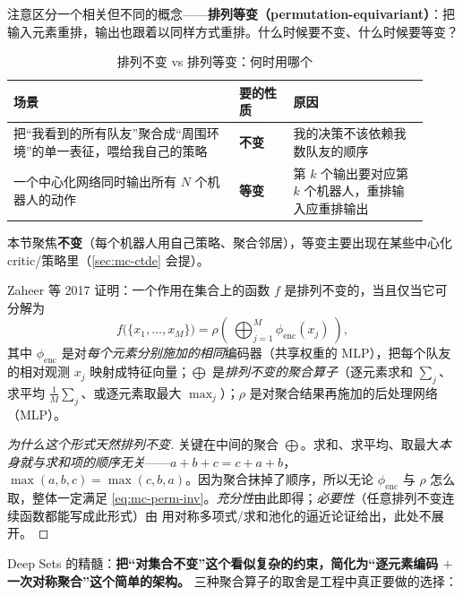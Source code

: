 \noindent 注意区分一个相关但不同的概念——\textbf{排列等变（permutation-equivariant）}：把输入元素重排，输出也跟着以同样方式重排。什么时候要不变、什么时候要等变？

\begin{table}[H]\centering\small
\caption{排列不变 vs 排列等变：何时用哪个}
\label{tab:mc-inv-equiv}
\begin{tabular}{p{0.50\linewidth}p{0.12\linewidth}p{0.30\linewidth}}
\toprule
场景 & 要的性质 & 原因 \\
\midrule
把“我看到的所有队友”聚合成“周围环境”的单一表征，喂给我自己的策略 & \textbf{不变} & 我的决策不该依赖我数队友的顺序 \\
一个中心化网络同时输出所有 $N$ 个机器人的动作 & \textbf{等变} & 第 $k$ 个输出要对应第 $k$ 个机器人，重排输入应重排输出 \\
\bottomrule
\end{tabular}
\end{table}

\noindent 本节聚焦\textbf{不变}（每个机器人用自己策略、聚合邻居），等变主要出现在某些中心化 critic/策略里（\cref{sec:mc-ctde} 会提）。

\begin{theorem}\label{thm:mc-deepsets}
Zaheer 等 2017 证明\cite{zaheer2017deepsets}：一个作用在集合上的函数 $f$ 是排列不变的，当且仅当它可分解为
\begin{equation}
  f\big(\{x_1,\dots,x_M\}\big)=\rho\!\left(\ \bigoplus_{j=1}^{M}\phi_{\mathrm{enc}}(x_j)\ \right),
  \label{eq:mc-deepsets}
\end{equation}
其中 $\phi_{\mathrm{enc}}$ 是对\emph{每个元素分别施加的相同}编码器（共享权重的 MLP），把每个队友的相对观测 $x_j$ 映射成特征向量；$\bigoplus$ 是\emph{排列不变的聚合算子}（逐元素求和 $\sum_j$、求平均 $\frac1M\sum_j$、或逐元素取最大 $\max_j$）；$\rho$ 是对聚合结果再施加的后处理网络（MLP）。
\end{theorem}

\begin{proof}[为什么这个形式天然排列不变]
关键在中间的聚合 $\bigoplus$。求和、求平均、取最大\emph{本身就与求和项的顺序无关}——$a+b+c=c+a+b$，$\max(a,b,c)=\max(c,b,a)$。因为聚合抹掉了顺序，所以无论 $\phi_{\mathrm{enc}}$ 与 $\rho$ 怎么取，整体一定满足 \cref{eq:mc-perm-inv}。\emph{充分性}由此即得；\emph{必要性}（任意排列不变连续函数都能写成此形式）由 \cite{zaheer2017deepsets} 用对称多项式/求和池化的逼近论证给出，此处不展开。
\end{proof}

\noindent Deep Sets 的精髓：\textbf{把“对集合不变”这个看似复杂的约束，简化为“逐元素编码 $+$ 一次对称聚合”这个简单的架构。} 三种聚合算子的取舍是工程中真正要做的选择：


